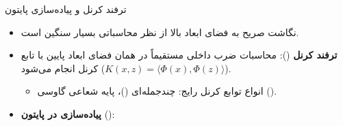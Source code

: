 \begin{frame}{ترفند کرنل و پیاده‌سازی پایتون}{}
  \begin{itemize}
    \setlength{\itemsep}{5pt}
    \item نگاشت صریح به فضای ابعاد بالا از نظر محاسباتی بسیار سنگین است.
    \item \textbf{ترفند کرنل} (): محاسبات ضرب داخلی مستقیماً در همان فضای ابعاد پایین با تابع کرنل انجام می‌شود ($K(x, z) = \langle\Phi(x), \Phi(z)\rangle$).
    \begin{itemize}
      \item انواع توابع کرنل رایج: چندجمله‌ای ()، پایه شعاعی گاوسی ().
    \end{itemize}
    \item \textbf{پیاده‌سازی در پایتون} ():
  \end{itemize}
  \vspace{0.15cm}
  \begin{latin}
    \begin{minipage}{0.96\textwidth}
    \end{minipage}
  \end{latin}
\end{frame}

